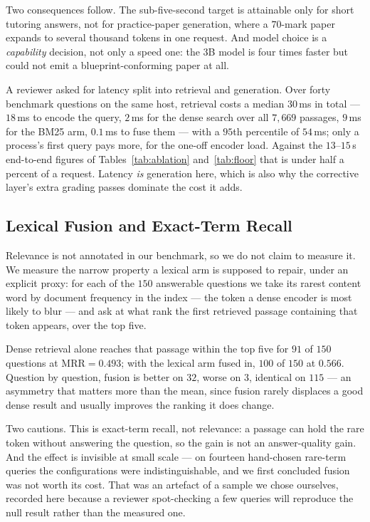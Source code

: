 \documentclass[conference]{IEEEtran}
\begin{document}
Two consequences follow. The sub-five-second target is attainable only for
short tutoring answers, not for practice-paper generation, where a $70$-mark
paper expands to several thousand tokens in one request. And model choice is a
\emph{capability} decision, not only a speed one: the $3$B model is four times
faster but could not emit a blueprint-conforming paper at all.

A reviewer asked for latency split into retrieval and generation. Over forty
benchmark questions on the same host, retrieval costs a median $30$\,ms in
total --- $18$\,ms to encode the query, $2$\,ms for the dense search over all
$7{,}669$ passages, $9$\,ms for the BM25 arm, $0.1$\,ms to fuse them --- with a
$95$th percentile of $54$\,ms; only a process's first query pays more, for the
one-off encoder load. Against the $13$--$15$\,s end-to-end figures of
Tables~\ref{tab:ablation} and~\ref{tab:floor} that is under half a percent of a
request. Latency \emph{is} generation here, which is also why the corrective
layer's extra grading passes dominate the cost it adds.

\subsection{Lexical Fusion and Exact-Term Recall}
\label{sec:hybrideval}
Relevance is not annotated in our benchmark, so we do not claim to measure it.
We measure the narrow property a lexical arm is supposed to repair, under an
explicit proxy: for each of the $150$ answerable questions we take its rarest
content word by document frequency in the index --- the token a dense encoder is
most likely to blur --- and ask at what rank the first retrieved passage
containing that token appears, over the top five.

Dense retrieval alone reaches that passage within the top five for $91$ of
$150$ questions at $\mathrm{MRR} = 0.493$; with the lexical arm fused in, $100$
of $150$ at $0.566$. Question by question, fusion is better on $32$, worse on
$3$, identical on $115$ --- an asymmetry that matters more than the mean, since
fusion rarely displaces a good dense result and usually improves the ranking it
does change.

Two cautions. This is exact-term recall, not relevance: a passage can hold the
rare token without answering the question, so the gain is not an answer-quality
gain. And the effect is invisible at small scale --- on fourteen hand-chosen
rare-term queries the configurations were indistinguishable, and we first
concluded fusion was not worth its cost. That was an artefact of a sample we
chose ourselves, recorded here because a reviewer spot-checking a few queries
will reproduce the null result rather than the measured one.
\end{document}
